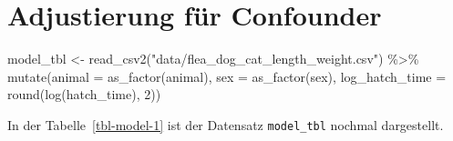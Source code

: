 \documentclass[
  letterpaper,
]{scrbook}
\newenvironment{Shaded}{\begin{snugshade}}{\end{snugshade}}
\newcommand{\AttributeTok}[1]{\textcolor[rgb]{0.40,0.45,0.13}{#1}}
\newcommand{\DecValTok}[1]{\textcolor[rgb]{0.68,0.00,0.00}{#1}}
\newcommand{\FunctionTok}[1]{\textcolor[rgb]{0.28,0.35,0.67}{#1}}
\newcommand{\NormalTok}[1]{\textcolor[rgb]{0.00,0.23,0.31}{#1}}
\newcommand{\OtherTok}[1]{\textcolor[rgb]{0.00,0.23,0.31}{#1}}
\newcommand{\SpecialCharTok}[1]{\textcolor[rgb]{0.37,0.37,0.37}{#1}}
\newcommand{\StringTok}[1]{\textcolor[rgb]{0.13,0.47,0.30}{#1}}
\begin{document}
\hypertarget{adjustierung-fuxfcr-confounder}{%
\section{Adjustierung für
Confounder}\label{adjustierung-fuxfcr-confounder}}

\begin{Shaded}
\begin{Highlighting}[]
\NormalTok{model\_tbl }\OtherTok{\textless{}{-}} \FunctionTok{read\_csv2}\NormalTok{(}\StringTok{"data/flea\_dog\_cat\_length\_weight.csv"}\NormalTok{) }\SpecialCharTok{\%\textgreater{}\%}
  \FunctionTok{mutate}\NormalTok{(}\AttributeTok{animal =} \FunctionTok{as\_factor}\NormalTok{(animal),}
         \AttributeTok{sex =} \FunctionTok{as\_factor}\NormalTok{(sex),}
         \AttributeTok{log\_hatch\_time =} \FunctionTok{round}\NormalTok{(}\FunctionTok{log}\NormalTok{(hatch\_time), }\DecValTok{2}\NormalTok{))}
\end{Highlighting}
\end{Shaded}

In der Tabelle~\ref{tbl-model-1} ist der Datensatz \texttt{model\_tbl}
nochmal dargestellt.
\end{document}

